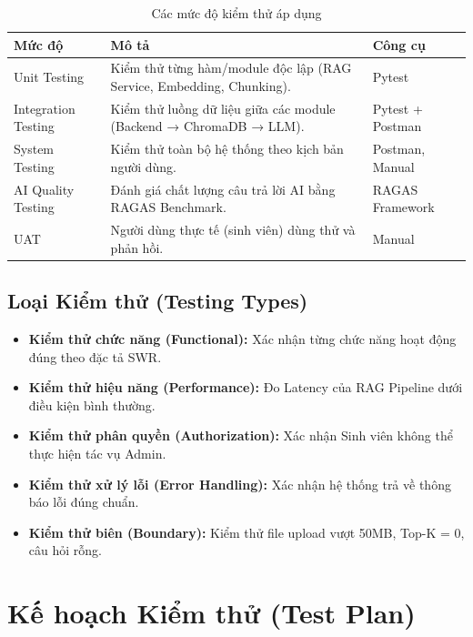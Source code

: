 \begin{table}[H]
  \centering
  \caption{Các mức độ kiểm thử áp dụng}
  \label{tab:test-levels}
  \renewcommand{\arraystretch}{1.5}
  \begin{tabularx}{\textwidth}{|l|X|l|}
    \hline
    \rowcolor{blue!10}
    \textbf{Mức độ} & \textbf{Mô tả} & \textbf{Công cụ} \\
    \hline
    Unit Testing & Kiểm thử từng hàm/module độc lập (RAG Service, Embedding, Chunking). & Pytest \\
    \hline
    Integration Testing & Kiểm thử luồng dữ liệu giữa các module (Backend → ChromaDB → LLM). & Pytest + Postman \\
    \hline
    System Testing & Kiểm thử toàn bộ hệ thống theo kịch bản người dùng. & Postman, Manual \\
    \hline
    AI Quality Testing & Đánh giá chất lượng câu trả lời AI bằng RAGAS Benchmark. & RAGAS Framework \\
    \hline
    UAT & Người dùng thực tế (sinh viên) dùng thử và phản hồi. & Manual \\
    \hline
  \end{tabularx}
\end{table}

\subsection{Loại Kiểm thử (Testing Types)}

\begin{itemize}[itemsep=4pt]
  \item \textbf{Kiểm thử chức năng (Functional):} Xác nhận từng chức năng hoạt động đúng theo đặc tả SWR.
  \item \textbf{Kiểm thử hiệu năng (Performance):} Đo Latency của RAG Pipeline dưới điều kiện bình thường.
  \item \textbf{Kiểm thử phân quyền (Authorization):} Xác nhận Sinh viên không thể thực hiện tác vụ Admin.
  \item \textbf{Kiểm thử xử lý lỗi (Error Handling):} Xác nhận hệ thống trả về thông báo lỗi đúng chuẩn.
  \item \textbf{Kiểm thử biên (Boundary):} Kiểm thử file upload vượt 50MB, Top-K = 0, câu hỏi rỗng.
\end{itemize}

\section{Kế hoạch Kiểm thử (Test Plan)}

